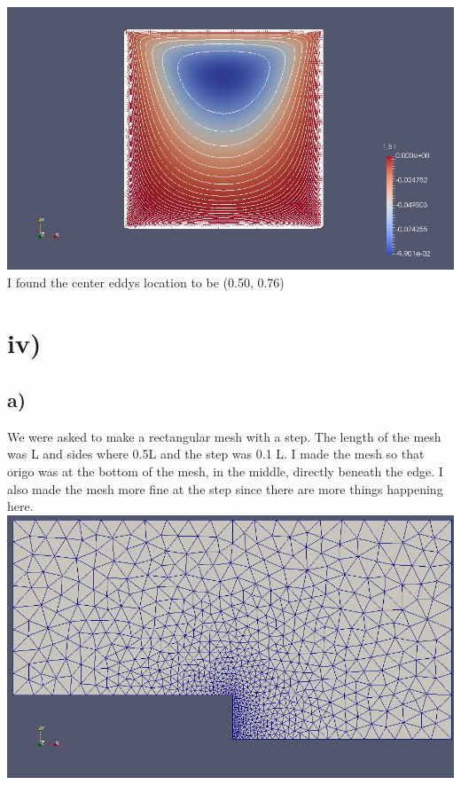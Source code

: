 \documentclass[a4paper,norsk]{article}
\begin{document}
\includegraphics[trim = 0mm 0mm 0mm 0mm, clip, scale=0.4]{Cavity_psi.png}
\newline
\newline
I found the center eddys location to be (0.50,  0.76)
\newpage
\section*{iv)}
\subsection*{a)}
We were asked to make a rectangular mesh with a step. The length of the mesh was L and sides where 0.5L and the step was 0.1 L. I made the mesh so that origo was at the bottom of the mesh, in the middle, directly beneath the edge. I also made the mesh more fine at the step since there are more things happening here. \newline
\includegraphics[trim = 0mm 0mm 0mm 0mm, clip, scale=0.4]{step_mesh.png}
\newline
\end{document}
